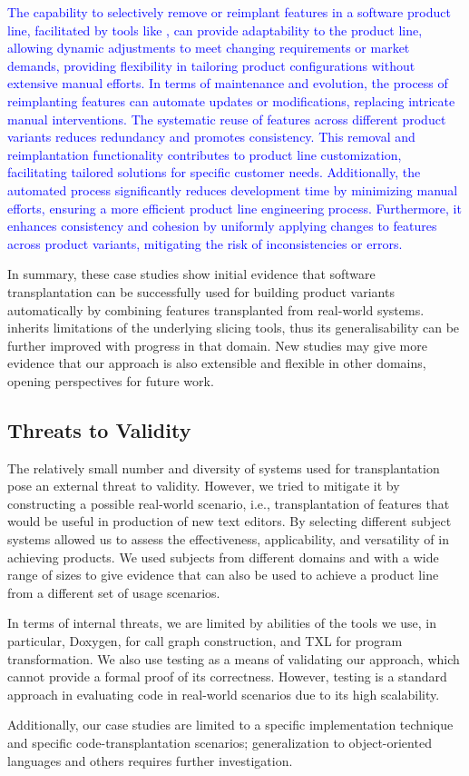 \textcolor{blue}{The capability to selectively remove or reimplant features in a software product line, facilitated by tools like \prodScalpel, can provide adaptability to the product line, allowing dynamic adjustments to meet changing requirements or market demands, providing flexibility in tailoring product configurations without extensive manual efforts. In terms of maintenance and evolution, the process of reimplanting features can automate updates or modifications, replacing intricate manual interventions. The systematic reuse of features across different product variants reduces redundancy and promotes consistency. This removal and reimplantation functionality contributes to product line customization, facilitating tailored solutions for specific customer needs. Additionally, the automated process significantly reduces development time by minimizing manual efforts, ensuring a more efficient product line engineering process. Furthermore, it enhances consistency and cohesion by uniformly applying changes to features across product variants, mitigating the risk of inconsistencies or errors.}

In summary, these case studies show initial evidence that software transplantation can be successfully used for building product variants automatically by combining features transplanted from real-world systems.
\prodscalpel inherits limitations of the underlying slicing tools, thus its generalisability can be further improved with progress in that domain.
New studies may give more evidence that our approach is also extensible and flexible in other domains, opening perspectives for future work.


\subsection{Threats to Validity} \label{ch-6:threats}

The relatively small number and diversity of systems used for transplantation pose an external threat to validity. However, we tried to mitigate it by constructing a possible real-world scenario, i.e., transplantation of features that would be useful in production of new text editors. By selecting different subject systems allowed us to assess the effectiveness, applicability, and versatility of \prodscalpel in achieving products. We used subjects from different domains and with a wide range of sizes to give evidence that \prodscalpel can also be used to achieve a product line from a different set of usage scenarios.

In terms of internal threats, we are limited by abilities of the tools we use, in particular, Doxygen, for call graph construction, and TXL for program transformation. We also use testing as a means of validating our approach, which cannot provide a formal proof of its correctness. However, testing is a standard approach in evaluating code in real-world scenarios due to its high scalability. 

Additionally, our case studies are limited to a specific implementation technique and specific code-transplantation scenarios; generalization to object-oriented languages and others requires further investigation. 
